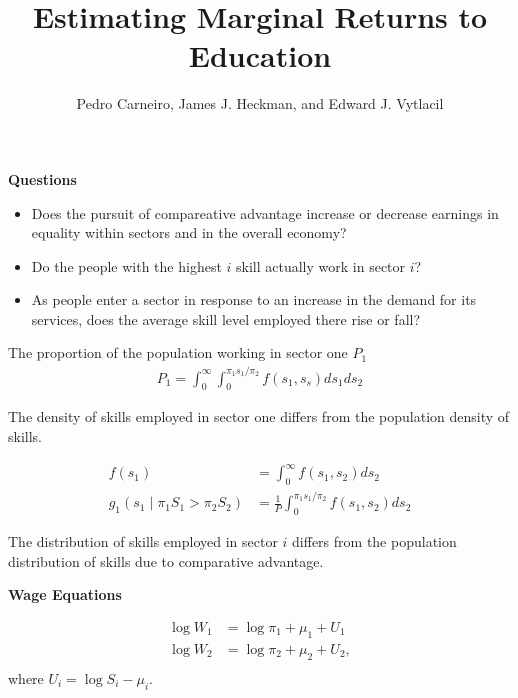 

\title{Estimating Marginal Returns to Education}
\author{Pedro Carneiro, James J. Heckman, and Edward J. Vytlacil}

\date{}

\let\otp\titlepage


\maketitle

\begin{frame}
\textbf{Questions}

\begin{itemize}
\item Does the pursuit of compareative advantage increase or decrease earnings in equality within sectors and in the overall economy?
\item Do the people with the highest $i$ skill actually work in sector $i$?
\item As people enter a sector in response to an increase in the demand for its services, does the average skill level employed there rise or fall?
\end{itemize}

\end{frame}

 \begin{frame}
 The proportion of the population working in sector one $P_1$
 \begin{align*}
 P_1 = \int^\infty_0 \int^{\pi_1 s_1 / \pi_2}_0 f(s_1, s_s) ds_1ds_2
 \end{align*}

 The density of skills employed in sector one differs from the population density of skills.

 \begin{align*}
 f(s_1) & = \int^\infty_0 f(s_1, s_2) ds_2 \\
 g_1(s_1 \mid \pi_1 S_1 > \pi_2 S_2) & = \frac{1}{P} \int^{\pi_1 s_1 /\pi_2}_0 f(s_1, s_2) ds_2
 \end{align*}


 The distribution of skills employed in sector $i$ differs from the population distribution of skills due to comparative advantage.
 \end{frame}


\begin{frame}

\textbf{Wage Equations}

\begin{align*}
\log W_1 & = \log \pi_1 + \mu_1 + U_1 \\
\log W_2 & = \log \pi_2 + \mu_2 + U_2, \\
\end{align*}
where $U_i = \log S_i - \mu_i$.

\end{frame}


